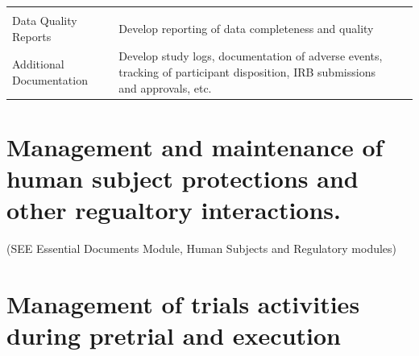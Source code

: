 \documentclass[]{book}
\begin{document}
\begin{longtable}[]{@{}llll@{}}
\begin{minipage}[t]{0.35\columnwidth}
\strut
\end{minipage} & \begin{minipage}[t]{0.17\columnwidth}\raggedright\strut
\strut
\end{minipage}\tabularnewline
\begin{minipage}[t]{0.08\columnwidth}\raggedright\strut
Data Quality Reports\strut
\end{minipage} & \begin{minipage}[t]{0.28\columnwidth}\raggedright\strut
Develop reporting of data completeness and quality\strut
\end{minipage} & \begin{minipage}[t]{0.35\columnwidth}\raggedright\strut
\strut
\end{minipage} & \begin{minipage}[t]{0.17\columnwidth}\raggedright\strut
\strut
\end{minipage}\tabularnewline
\begin{minipage}[t]{0.08\columnwidth}\raggedright\strut
Additional Documentation\strut
\end{minipage} & \begin{minipage}[t]{0.28\columnwidth}\raggedright\strut
Develop study logs, documentation of adverse events, tracking of
participant disposition, IRB submissions and approvals, etc.\strut
\end{minipage} & \begin{minipage}[t]{0.35\columnwidth}\raggedright\strut
\strut
\end{minipage} & \begin{minipage}[t]{0.17\columnwidth}\raggedright\strut
\strut
\end{minipage}\tabularnewline
\bottomrule
\end{longtable}

\section{Management and maintenance of human subject protections and
other regualtory
interactions.}\label{management-and-maintenance-of-human-subject-protections-and-other-regualtory-interactions.}

(SEE Essential Documents Module, Human Subjects and Regulatory modules)

\section{Management of trials activities during pretrial and
execution}\label{management-of-trials-activities-during-pretrial-and-execution}
\end{document}
